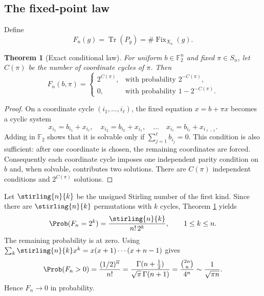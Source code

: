 \documentclass[10pt]{article}
\newcommand{\Tr}{\operatorname{Tr}}
\newcommand{\Fix}{\operatorname{Fix}}
\newcommand{\F}{\mathbb F}
\newtheorem{theorem}{Theorem}
\begin{document}
\subsection{The fixed-point law}
Define
\[
F_n(g)=\Tr(P_g)=\#\Fix_{X_n}(g).
\]

\begin{theorem}[Exact conditional law]\label{hyperoctahedral-cube-proof-and-verification:thm:fixed-law}
For uniform $b\in\F_2^n$ and fixed $\pi\in S_n$, let $C(\pi)$ be the number
of coordinate cycles of $\pi$.  Then
\[
F_n(b,\pi)=
\begin{cases}
2^{C(\pi)},&\text{with probability }2^{-C(\pi)},\\
0,&\text{with probability }1-2^{-C(\pi)}.
\end{cases}
\]
\end{theorem}

\begin{proof}
On a coordinate cycle $(i_1,\ldots,i_\ell)$, the fixed equation
$x=b+\pi x$ becomes a cyclic system
\[
x_{i_1}=b_{i_1}+x_{i_\ell},\quad
x_{i_2}=b_{i_2}+x_{i_1},\quad\ldots\quad
x_{i_\ell}=b_{i_\ell}+x_{i_{\ell-1}}.
\]
Adding in $\F_2$ shows that it is solvable only if
$\sum_{j=1}^{\ell}b_{i_j}=0$.  This condition is also sufficient: after one
coordinate is chosen, the remaining coordinates are forced.  Consequently
each coordinate cycle imposes one independent parity condition on $b$ and,
when solvable, contributes two solutions.  There are $C(\pi)$ independent
conditions and $2^{C(\pi)}$ solutions.
\end{proof}

Let $\stirling{n}{k}$ be the unsigned Stirling number of the first kind.  Since
there are $\stirling{n}{k}$ permutations with $k$ cycles, Theorem
\ref{hyperoctahedral-cube-proof-and-verification:thm:fixed-law} yields
\begin{equation}\label{hyperoctahedral-cube-proof-and-verification:eq:distribution}
\Prob(F_n=2^k)=\frac{\stirling{n}{k}}{n!\,2^k},
\qquad 1\leq k\leq n.
\end{equation}
The remaining probability is at zero.  Using
$\sum_k\stirling{n}{k}x^k=x(x+1)\cdots(x+n-1)$ gives
\begin{equation}\label{hyperoctahedral-cube-proof-and-verification:eq:positive-probability}
\Prob(F_n>0)
=\frac{(1/2)^{\overline n}}{n!}
=\frac{\Gamma(n+\tfrac12)}{\sqrt\pi\,\Gamma(n+1)}
=\frac{\binom{2n}{n}}{4^n}
\sim\frac1{\sqrt{\pi n}}.
\end{equation}
Hence $F_n\to0$ in probability.
\end{document}
